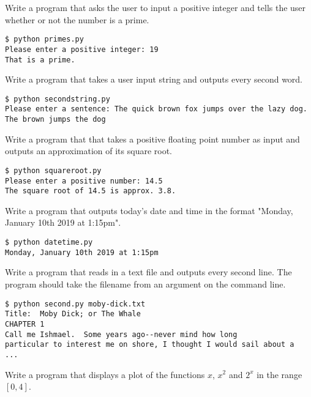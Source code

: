 \documentclass[a4paper, 12pt]{exam}
\begin{document}
\begin{questions}
    \newpage


    \question
    Write a program that asks the user to input a positive integer and tells the user whether or not the number is a prime.
    \begin{verbatim}
$ python primes.py
Please enter a positive integer: 19
That is a prime.
    \end{verbatim}
    
    \question
    Write a program that takes a user input string and outputs every second word.
    \begin{verbatim}
$ python secondstring.py
Please enter a sentence: The quick brown fox jumps over the lazy dog.
The brown jumps the dog
    \end{verbatim}

    \question
    Write a program that that takes a positive floating point number as input and outputs an approximation of its square root.
    \begin{verbatim}
$ python squareroot.py
Please enter a positive number: 14.5
The square root of 14.5 is approx. 3.8.
    \end{verbatim}

    \question
    Write a program that outputs today's date and time in the format "Monday, January 10th 2019 at 1:15pm".
    \begin{verbatim}
$ python datetime.py
Monday, January 10th 2019 at 1:15pm
    \end{verbatim}

    \question
    Write a program that reads in a text file and outputs every second line.
    The program should take the filename from an argument on the command line.
    \begin{verbatim}
$ python second.py moby-dick.txt
Title:  Moby Dick; or The Whale
CHAPTER 1
Call me Ishmael.  Some years ago--never mind how long
particular to interest me on shore, I thought I would sail about a
...
    \end{verbatim}

    \question
    Write a program that displays a plot of the functions $x$, $x^2$ and $2^x$ in the range $[0, 4]$.

  \end{questions}
\end{document}
